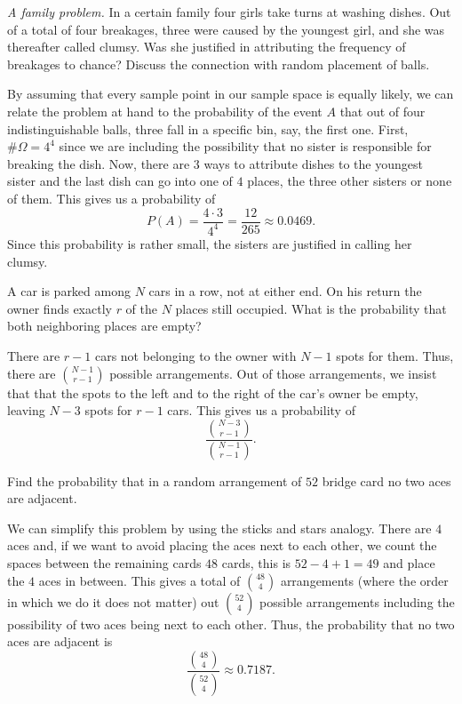 \begin{problem}[Handout 2, \# 14]
  \emph{A family problem.} In a certain family four girls take turns at
  washing dishes. Out of a total of four breakages, three were caused by
  the youngest girl, and she was thereafter called clumsy. Was she
  justified in attributing the frequency of breakages to chance? Discuss
  the connection with random placement of balls.
\end{problem}
\begin{solution}
  By assuming that every sample point in our sample space is equally
  likely, we can relate the problem at hand to the probability of the event
  \(A\) that out of four indistinguishable balls, three fall in a specific
  bin, say, the first one. First, \(\#\Omega=4^4\) since we are including
  the possibility that no sister is responsible for breaking the dish. Now,
  there are \(3\) ways to attribute dishes to the youngest sister and the
  last dish can go into one of \(4\) places, the three other sisters or
  none of them. This gives us a probability of
  \[
    P(A)=\frac{4\cdot 3}{4^4}=\frac{12}{265}\approx 0.0469.
  \]
  Since this probability is rather small, the sisters are justified in
  calling her clumsy.
\end{solution}
\newpage

\begin{problem}[Handout 2, \# 15]
  A car is parked among \(N\) cars in a row, not at either end. On his
  return the owner finds exactly \(r\) of the \(N\) places still
  occupied. What is the probability that both neighboring places are empty?
\end{problem}
\begin{solution}
  There are \(r-1\) cars not belonging to the owner with \(N-1\) spots for
  them. Thus, there are \(\displaystyle \binom{N-1}{r-1}\) possible
  arrangements. Out of those arrangements, we insist that that the spots to
  the left and to the right of the car's owner be empty, leaving \(N-3\)
  spots for \(r-1\) cars. This gives us a probability of
  \[
    \frac{\displaystyle\binom{N-3}{r-1}}{\displaystyle\binom{N-1}{r-1}}.
  \]
\end{solution}
\newpage

\begin{problem}[Handout 2, \# 16]
  Find the probability that in a random arrangement of \(52\) bridge card
  no two aces are adjacent.
\end{problem}
\begin{solution}
  We can simplify this problem by using the sticks and stars analogy. There
  are \(4\) aces and, if we want to avoid placing the aces next to each
  other, we count the spaces between the remaining cards \(48\) cards, this
  is \(52-4+1=49\) and place the \(4\) aces in between. This gives a total
  of \(\displaystyle\binom{48}{4}\) arrangements (where the order in which
  we do it does not matter) out \(\displaystyle\binom{52}{4}\) possible
  arrangements including the possibility of two aces being next to each
  other. Thus, the probability that no two aces are adjacent is
  \[
    \frac{\displaystyle \binom{48}{4}}{\displaystyle \binom{52}{4}}\approx 0.7187.
  \]
\end{solution}
\newpage

